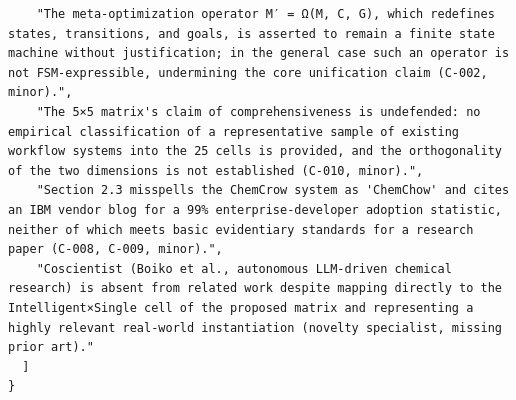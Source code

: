 \documentclass[11pt]{article}
\begin{document}
\begin{verbatim}
    "The meta-optimization operator M′ = Ω(M, C, G), which redefines states, transitions, and goals, is asserted to remain a finite state machine without justification; in the general case such an operator is not FSM-expressible, undermining the core unification claim (C-002, minor).",
    "The 5×5 matrix's claim of comprehensiveness is undefended: no empirical classification of a representative sample of existing workflow systems into the 25 cells is provided, and the orthogonality of the two dimensions is not established (C-010, minor).",
    "Section 2.3 misspells the ChemCrow system as 'ChemChow' and cites an IBM vendor blog for a 99% enterprise-developer adoption statistic, neither of which meets basic evidentiary standards for a research paper (C-008, C-009, minor).",
    "Coscientist (Boiko et al., autonomous LLM-driven chemical research) is absent from related work despite mapping directly to the Intelligent×Single cell of the proposed matrix and representing a highly relevant real-world instantiation (novelty specialist, missing prior art)."
  ]
}
\end{verbatim}
\end{document}
